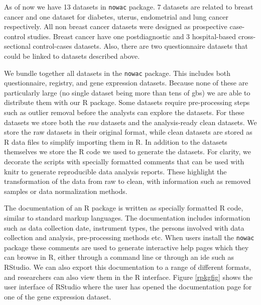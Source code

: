 As of now we have 13 datasets in \texttt{nowac} package. 7 datasets are related
to breast cancer and one dataset for diabetes, uterus, endometrial and lung
cancer respectively. All non breast cancer datasets were designed as prospective
case-control studies.  Breast cancer have one postdiagnostic and 3
hospital-based cross-sectional control-cases datasets. Also, there are two
questionnaire datasets that could be linked to datasets described above.

We bundle together all datasets in the \texttt{nowac} package. This includes
both questionnaire, registry, and gene expression datasets. Because none of these
are particularly large (no single dataset being more than tens of
\glspl{gb}) we are able to distribute them with our R package. Some
datasets require pre-processing steps such as outlier removal before the
analysts can explore the datasets. For these datasets we store both the
\emph{raw} datasets and the analysis-ready clean datasets. We store the
raw datasets in their original format, while clean datasets are stored as R data
files to simplify importing them in R. In addition to the datasets themselves we
store the R code we used to generate the datasets. For clarity, we decorate the
scripts with specially formatted comments that can be used with
knitr\cite{xie2016dynamic} to generate reproducible data analysis reports. These
highlight the transformation of the data from raw to clean, with information
such as removed samples or data normalization methods. 

The documentation of an R package is written as specially formatted R code,
similar to standard markup languages.  The documentation includes information
such as data collection date, instrument types, the persons involved with data
collection and analysis, pre-processing methods etc.  When users install the
\texttt{nowac} package these comments are used to generate interactive help
pages which they can browse in R, either through a command line or through an
\gls{ide} such as RStudio.
We can also export this documentation to a range of different formats, and
researchers can also view them in the R interface. Figure \ref{rpkgfig} shows
the user interface of RStudio where the user has opened the documentation page
for one of the gene expression dataset. 

